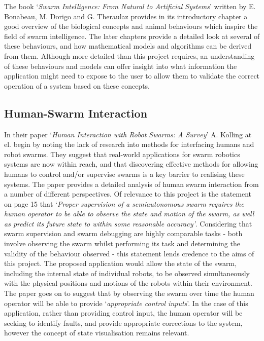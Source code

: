 \documentclass[titlepage,hidelinks,10pt]{article}
\begin{document}
The book `\textit{Swarm Intelligence: From Natural to Artificial Systems}' written by E. Bonabeau, M. Dorigo and G. Theraulaz provides in its introductory chapter a good overview of the biological concepts and animal behaviours which inspire the field of swarm intelligence\cite{FromNaturaltoArtificial}. The later chapters provide a detailed look at several of these behaviours, and how mathematical models and algorithms can be derived from them. Although more detailed than this project requires, an understanding of these behaviours and models can offer insight into what information the application might need to expose to the user to allow them to validate the correct operation of a system based on these concepts. 

\subsection{Human-Swarm Interaction} \label{HumanSwarmInteraction}
In their paper `\textit{Human Interaction with Robot Swarms: A Survey}\cite{HumanSwarmInteractionSurvey}' A. Kolling at el. begin by noting the lack of research into methods for interfacing humans and robot swarms. They suggest that real-world applications for swarm robotics systems are now within reach, and that discovering effective methods for allowing humans to control and/or supervise swarms is a key barrier to realising these systems. The paper provides a detailed analysis of human swarm interaction from a number of different perspectives. Of relevance to this project is the statement on page 15 that `\textit{Proper supervision of a semiautonomous swarm requires the human operator to be able to observe the state and motion of the swarm, as well as predict its future state to within some reasonable accuracy'}. Considering that swarm supervision and swarm debugging are highly comparable tasks - both involve observing the swarm whilst performing its task and determining the validity of the behaviour observed  - this statement lends credence to the aims of this project. The proposed application would allow the state of the swarm, including the internal state of individual robots, to be observed simultaneously with the physical positions and motions of the robots within their environment. The paper goes on to suggest that by observing the swarm over time the human operator will be able to provide `\textit{appropriate control inputs}'. In the case of this application, rather than providing control input, the human operator will be seeking to identify faults, and provide appropriate corrections to the system, however the concept of state visualisation remains relevant.
\end{document}
